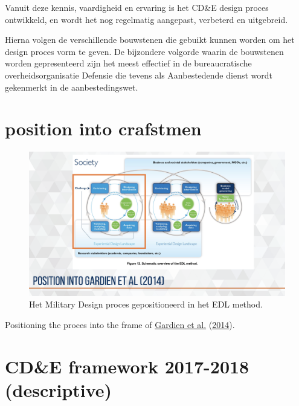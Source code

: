 \documentclass[
]{book}
\begin{document}
Vanuit deze kennis, vaardigheid en ervaring is het CD\&E design proces ontwikkeld, en wordt het nog regelmatig aangepast, verbeterd en uitgebreid.

Hierna volgen de verschillende bouwstenen die gebuikt kunnen worden om het design proces vorm te geven. De bijzondere volgorde waarin de bouwstenen worden gepresenteerd zijn het meest effectief in de bureaucratische overheidsorganisatie Defensie die tevens als Aanbestedende dienst wordt gekenmerkt in de aanbestedingswet.

\hypertarget{position-into-crafstmen}{%
\section{position into crafstmen}\label{position-into-crafstmen}}

\begin{figure}
\includegraphics[width=26.67in]{data/keynote-slides/20200430-CDE-Designprocess/20200430-CDE-Designprocess.019} \caption{Het Military Design proces gepositioneerd in het EDL method.}\label{fig:unnamed-chunk-27}
\end{figure}

Positioning the proces into the frame of \protect\hyperlink{ref-gardien_changing_2014}{Gardien et al.} (\protect\hyperlink{ref-gardien_changing_2014}{2014}).

\hypertarget{cde-framework-2017-2018-descriptive}{%
\section{CD\&E framework 2017-2018 (descriptive)}\label{cde-framework-2017-2018-descriptive}}
\end{document}
